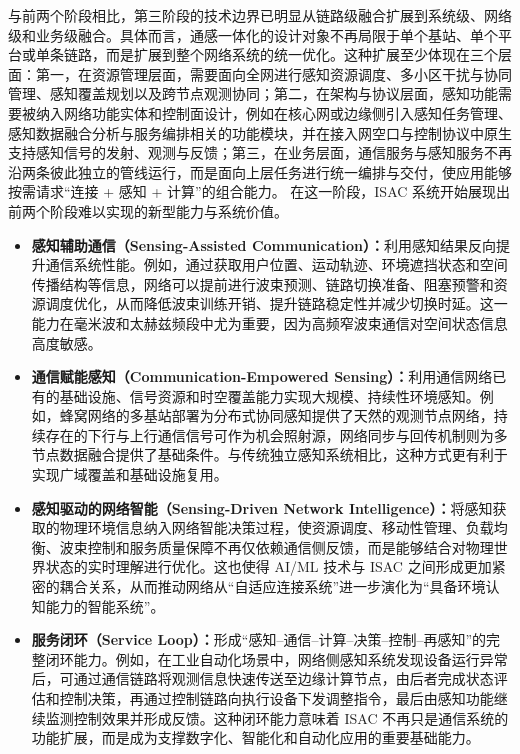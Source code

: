 与前两个阶段相比，第三阶段的技术边界已明显从链路级融合扩展到系统级、网络级和业务级融合。具体而言，通感一体化的设计对象不再局限于单个基站、单个平台或单条链路，而是扩展到整个网络系统的统一优化。这种扩展至少体现在三个层面\cite{Zhang2020perceptive,Cui2024integrated}：第一，在资源管理层面，需要面向全网进行感知资源调度、多小区干扰与协同管理、感知覆盖规划以及跨节点观测协同；第二，在架构与协议层面，感知功能需要被纳入网络功能实体和控制面设计，例如在核心网或边缘侧引入感知任务管理、感知数据融合分析与服务编排相关的功能模块，并在接入网空口与控制协议中原生支持感知信号的发射、观测与反馈；第三，在业务层面，通信服务与感知服务不再沿两条彼此独立的管线运行，而是面向上层任务进行统一编排与交付，使应用能够按需请求“连接 + 感知 + 计算”的组合能力。
在这一阶段，ISAC 系统开始展现出前两个阶段难以实现的新型能力与系统价值。
\begin{itemize}
    \item \textbf{感知辅助通信（Sensing-Assisted Communication）：}利用感知结果反向提升通信系统性能。例如，通过获取用户位置、运动轨迹、环境遮挡状态和空间传播结构等信息，网络可以提前进行波束预测、链路切换准备、阻塞预警和资源调度优化，从而降低波束训练开销、提升链路稳定性并减少切换时延\cite{Liu2022ISAC,Zhang2020perceptive}。这一能力在毫米波和太赫兹频段中尤为重要，因为高频窄波束通信对空间状态信息高度敏感。
    \item \textbf{通信赋能感知（Communication-Empowered Sensing）：}利用通信网络已有的基础设施、信号资源和时空覆盖能力实现大规模、持续性环境感知\cite{Liu2022ISAC,Gonzalez2024integrated}。例如，蜂窝网络的多基站部署为分布式协同感知提供了天然的观测节点网络，持续存在的下行与上行通信信号可作为机会照射源，网络同步与回传机制则为多节点数据融合提供了基础条件。与传统独立感知系统相比，这种方式更有利于实现广域覆盖和基础设施复用。
    \item \textbf{感知驱动的网络智能（Sensing-Driven Network Intelligence）：}将感知获取的物理环境信息纳入网络智能决策过程，使资源调度、移动性管理、负载均衡、波束控制和服务质量保障不再仅依赖通信侧反馈，而是能够结合对物理世界状态的实时理解进行优化\cite{Saad2020Vision6G,Cui2024integrated}。这也使得 AI/ML 技术与 ISAC 之间形成更加紧密的耦合关系，从而推动网络从“自适应连接系统”进一步演化为“具备环境认知能力的智能系统”。
    \item \textbf{服务闭环（Service Loop）：}形成“感知--通信--计算--决策--控制--再感知”的完整闭环能力\cite{Saad2020Vision6G,Liu2022ISAC}。例如，在工业自动化场景中，网络侧感知系统发现设备运行异常后，可通过通信链路将观测信息快速传送至边缘计算节点，由后者完成状态评估和控制决策，再通过控制链路向执行设备下发调整指令，最后由感知功能继续监测控制效果并形成反馈。这种闭环能力意味着 ISAC 不再只是通信系统的功能扩展，而是成为支撑数字化、智能化和自动化应用的重要基础能力。
\end{itemize}
